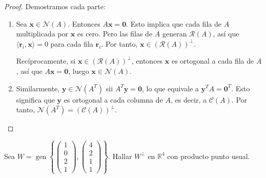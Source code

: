 \begin{proof}
Demostramos cada parte:
\begin{enumerate}
    \item Sea $\mathbf{x} \in \mathcal{N}(A)$. Entonces $A\mathbf{x} = \mathbf{0}$. Esto implica que cada fila de $A$ multiplicada por $\mathbf{x}$ es cero. Pero las filas de $A$ generan $\mathcal{R}(A)$, así que $\langle \mathbf{r}_i, \mathbf{x} \rangle = 0$ para cada fila $\mathbf{r}_i$. Por tanto, $\mathbf{x} \in (\mathcal{R}(A))^\perp$.
    
    Recíprocamente, si $\mathbf{x} \in (\mathcal{R}(A))^\perp$, entonces $\mathbf{x}$ es ortogonal a cada fila de $A$, así que $A\mathbf{x} = \mathbf{0}$, luego $\mathbf{x} \in \mathcal{N}(A)$.
    
    \item Similarmente, $\mathbf{y} \in \mathcal{N}(A^T)$ sii $A^T \mathbf{y} = \mathbf{0}$, lo que equivale a $\mathbf{y}^T A = \mathbf{0}^T$. Esto significa que $\mathbf{y}$ es ortogonal a cada columna de $A$, es decir, a $\mathcal{C}(A)$. Por tanto, $\mathcal{N}(A^T) = (\mathcal{C}(A))^\perp$.
\end{enumerate}
\end{proof}

\begin{example}
Sea $W = \operatorname{gen} \left\{ \begin{pmatrix} 1 \\ 0 \\ 2 \\ 1 \end{pmatrix}, \begin{pmatrix} 4 \\ 2 \\ 1 \\ 1 \end{pmatrix} \right\}$. Hallar $W^\perp$ en $\mathbb{R}^4$ con producto punto usual.
\end{example}

